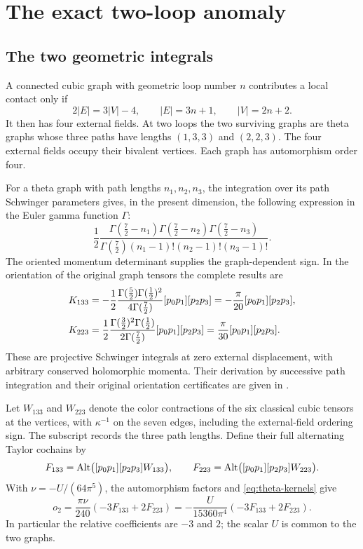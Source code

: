 \section{The exact two-loop anomaly}\label{sec:two-loop}

\subsection{The two geometric integrals}

A connected cubic graph with geometric loop number $n$ contributes a
local contact only if
\[
 2|E|=3|V|-4,\qquad |E|=3n+1,\qquad |V|=2n+2 .
\]
It then has four external fields. At two loops the two surviving
graphs are theta graphs whose three paths have lengths $(1,3,3)$
and $(2,2,3)$. The four external fields occupy their bivalent
vertices. Each graph has automorphism order four.

For a theta graph with path lengths $n_1,n_2,n_3$, the integration
over its path Schwinger parameters gives, in the present dimension,
the following expression in the Euler gamma function $\Gamma$:
\[
 \frac12
 \frac{\Gamma(\frac72-n_1)\Gamma(\frac72-n_2)
       \Gamma(\frac72-n_3)}
      {\Gamma(\frac72)(n_1-1)!(n_2-1)!(n_3-1)!}.
\]
The oriented momentum determinant supplies the graph-dependent sign.
In the orientation
of the original graph tensors the complete results are
\begin{align}
 K_{133}
 &=-\frac12\frac{\Gamma(\frac52)\Gamma(\frac12)^2}
                    {4\Gamma(\frac72)}
       [p_0p_1][p_2p_3]
   =-\frac{\pi}{20}[p_0p_1][p_2p_3],\notag\\
 K_{223}
 &=\frac12\frac{\Gamma(\frac32)^2\Gamma(\frac12)}
                    {2\Gamma(\frac72)}
       [p_0p_1][p_2p_3]
   =\frac{\pi}{30}[p_0p_1][p_2p_3].
 \label{eq:theta-kernels}
\end{align}
These are projective Schwinger integrals at zero external
displacement, with arbitrary conserved holomorphic momenta.
Their derivation by successive path integration and their original
orientation certificates are given in \cite{RepoOriginal}.

Let $W_{133}$ and $W_{223}$ denote the color contractions of the
six classical cubic tensors at the vertices, with $\kappa^{-1}$
on the seven edges, including the external-field ordering sign.
The subscript records the three path lengths. Define their full
alternating Taylor cochains by
\begin{equation}
 F_{133}=\operatorname{Alt}\bigl([p_0p_1][p_2p_3]W_{133}\bigr),\qquad
 F_{223}=\operatorname{Alt}\bigl([p_0p_1][p_2p_3]W_{223}\bigr).
 \label{eq:theta-cochains}
\end{equation}
With $\nu=-U/(64\pi^5)$, the automorphism factors and
\eqref{eq:theta-kernels} give
\begin{equation}
 \boxed{\quad
 o_2=\frac{\pi\nu}{240}(-3F_{133}+2F_{223})
     =-\frac{U}{15360\pi^4}(-3F_{133}+2F_{223}).
 \quad}
 \label{eq:o2}
\end{equation}
In particular the relative coefficients are $-3$ and $2$;
the scalar $U$ is common to the two graphs.

